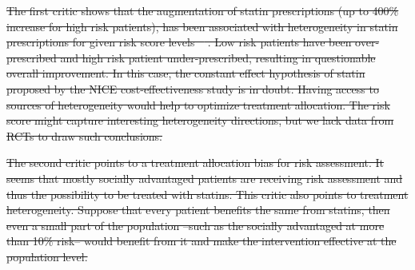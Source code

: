 \documentclass[10pt,letterpaper]{article}
\providecommand{\DIFdeltex}[1]{{\protect\color{red}\sout{#1}}}                      %
\providecommand{\DIFdelbegin}{} %
\providecommand{\DIFdelend}{} %
\providecommand{\DIFdel}[1]{\texorpdfstring{\DIFdeltex{#1}}{}} %
\newcommand{\DIFscaledelfig}{0.5}
\newlength{\DIFdelgraphicswidth} %
\newlength{\DIFdelgraphicsheight} %
\newcommand{\DIFdelincludegraphics}[2][]{%
\sbox{\DIFdelgraphicsbox}{\DIFOincludegraphics[#1]{#2}}%
\settoboxwidth{\DIFdelgraphicswidth}{\DIFdelgraphicsbox} %
\settoboxtotalheight{\DIFdelgraphicsheight}{\DIFdelgraphicsbox} %
\scalebox{\DIFscaledelfig}{%
\parbox[b]{\DIFdelgraphicswidth}{\usebox{\DIFdelgraphicsbox}\\[-\baselineskip] \rule{\DIFdelgraphicswidth}{0em}}\llap{\resizebox{\DIFdelgraphicswidth}{\DIFdelgraphicsheight}{%
\setlength{\unitlength}{\DIFdelgraphicswidth}%
\begin{picture}(1,1)%
\thicklines\linethickness{2pt} %
{\color[rgb]{1,0,0}\put(0,0){\framebox(1,1){}}}%
{\color[rgb]{1,0,0}\put(0,0){\line( 1,1){1}}}%
{\color[rgb]{1,0,0}\put(0,1){\line(1,-1){1}}}%
\end{picture}%
}\hspace*{3pt}}} %
} %
\DeclareRobustCommand{\DIFdelbegin}{\DIFOdelbegin \let\includegraphics\DIFdelincludegraphics} %
\DeclareRobustCommand{\DIFdelend}{\DIFOaddend \let\includegraphics\DIFOincludegraphics} %
\begin{document}
\DIFdelbegin %
\DIFdel{The first critic shows that the augmentation of statin prescriptions
        (up to 400\% increase for high risk patients), has been associated with
        heterogeneity in statin prescriptions for given risk score levels
        \mbox{%
\cite{van2013efficiency}}\hskip0pt%
. Low risk patients have been over-prescribed
        and high risk patient under-prescribed, resulting in questionable overall
        improvement. In this case, the constant effect
        hypothesis of statin proposed by the NICE cost-effectiveness study is in doubt.
        Having access to sources of heterogeneity would help to optimize
        treatment allocation. The risk score might capture interesting
        heterogeneity directions, but we lack data from RCTs to draw such conclusions.
}\DIFdelend %

\DIFdelbegin %
\DIFdel{The second critic points to a treatment allocation bias for risk
        assessment. It seems that mostly socially advantaged patients are
        receiving risk assessment and thus the possibility to be treated with
        statins. This critic also points to treatment heterogeneity.
        Suppose that every patient benefits the same from statins, then even a
        small part of the population --such as the socially advantaged at more
        than 10\% risk-- would benefit from it and make the intervention
        effective at the population level.
}%
\DIFdelend %
\end{document}
